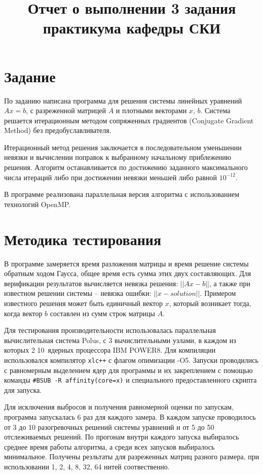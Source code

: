 \documentclass[12pt, oneside, a4paper]{article}
\begin{document}
\title{Отчет о выполнении 3 задания практикума кафедры СКИ}

\section{Задание}

По заданию написана программа для решения системы линейных уравнений $Ax = b$, с разреженной матрицей $A$ и плотными векторами $x$, $b$. Система решается итерационным методом сопряженных градиентов (Conjugate Gradient Method) без предобуславливателя.

Итерационный метод решения заключается в последовательном уменьшении невязки и вычислении поправок к выбранному начальному приблежению решения. Алгоритм останавливается по достижению заданного максимального числа итераций либо при достижении невязки меньшей либо равной $10^{-12}$.

В программе реализована параллельная версия алгоритма с использованием технологий OpenMP.

\section{Методика тестирования}

В программе замеряется время разложения матрицы и время решение системы обратным ходом Гаусса, общее время есть сумма этих двух составляющих. Для верификации результатов вычисляется невязка решения: $||Ax - b||$, а также при известном решении системы -- невязка ошибки: $||x - solution||$. Примером известного решения может быть единичный вектор $x$, который возникает тогда, когда вектор $b$ составлен из сумм строк матрицы $A$.

Для тестирования производительности использовалась параллельная вычислительная система Polus, с 3 вычислительными узлами, в каждом из которых 2 10~ядерных процессора IBM POWER8. Для компиляции использовался компилятор \texttt{xlc++} с флагом опимизации -O5. Запуски проводились с равномерным выделением ядер для программы и их закреплением с помощью команды \texttt{\#BSUB -R affinity(core=x)} и специального предоставленного скрипта для запуска.

Для исключения выбросов и получения равномерной оценки по запускам, программа запускалась 6 раз для каждого замера. В каждом запуске проводилось от 3 до 10 разогревочных решений системы уравнений и от 5 до 50 отслеживаемых решений. По прогонам внутри каждого запуска выбиралось среднее время работы алгоритма, а среди всех запусков выбиралось минимальное. Получены резльтаты для разреженных матриц разного размера, при использовании 1, 2, 4, 8, 32, 64 нитей соотвественно.
\end{document}

